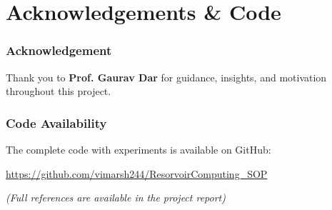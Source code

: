 \documentclass{beamer}
\begin{document}
\section*{Acknowledgements \& Code}

\begin{frame}
    \frametitle{Acknowledgement}
    \Large
    Thank you to \textbf{Prof. Gaurav Dar} for guidance, insights, and motivation throughout this project.
\end{frame}

\begin{frame}
    \frametitle{Code Availability}
    \Large
    The complete code with experiments is available on GitHub:

    \bigskip
    \url{https://github.com/vimarsh244/ResorvoirComputing_SOP}

    \bigskip
    \textit{(Full references are available in the project report)}
\end{frame}
\end{document}
